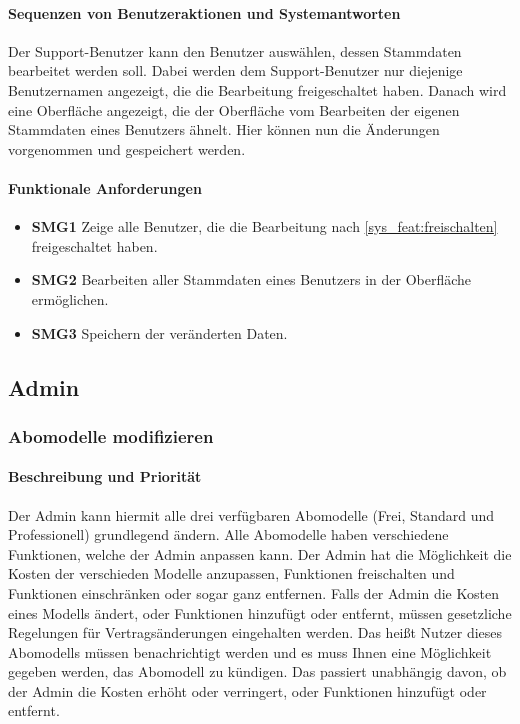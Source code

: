 \paragraph{Sequenzen von Benutzeraktionen und Systemantworten}
Der Support-Benutzer kann den Benutzer auswählen, dessen Stammdaten bearbeitet werden soll. Dabei werden dem Support-Benutzer nur diejenige Benutzernamen angezeigt, die die Bearbeitung freigeschaltet haben. Danach wird eine Oberfläche angezeigt, die der Oberfläche vom Bearbeiten der eigenen Stammdaten eines Benutzers ähnelt. Hier können nun die Änderungen vorgenommen und gespeichert werden. 
\paragraph{Funktionale Anforderungen}
\begin{itemize}
	\item \textbf{SMG1} Zeige alle Benutzer, die die Bearbeitung nach \ref{sys_feat:freischalten} freigeschaltet haben.
	\item \textbf{SMG2} Bearbeiten aller Stammdaten eines Benutzers in der Oberfläche ermöglichen.
	\item \textbf{SMG3} Speichern der veränderten Daten. 
\end{itemize}

\subsection{Admin}
\subsubsection{Abomodelle modifizieren}
\paragraph{Beschreibung und Priorität}
Der Admin kann hiermit alle drei verfügbaren Abomodelle (Frei, Standard und Professionell) grundlegend ändern. Alle Abomodelle haben verschiedene Funktionen, welche der Admin anpassen kann. Der Admin hat die Möglichkeit die Kosten der verschieden Modelle anzupassen, Funktionen freischalten und Funktionen einschränken oder sogar ganz entfernen. Falls der Admin die Kosten eines Modells ändert, oder Funktionen hinzufügt oder entfernt, müssen gesetzliche Regelungen für Vertragsänderungen eingehalten werden. Das heißt Nutzer dieses Abomodells müssen benachrichtigt werden und es muss Ihnen eine Möglichkeit gegeben werden, das Abomodell zu kündigen. Das passiert unabhängig davon, ob der Admin die Kosten erhöht oder verringert, oder Funktionen hinzufügt oder entfernt. 

